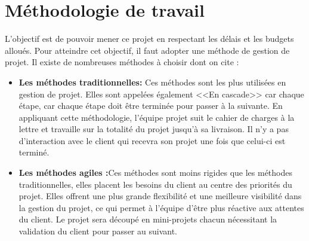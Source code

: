 \section{Méthodologie de travail}
L'objectif est de pouvoir mener ce projet en respectant les délais et les budgets alloués. Pour atteindre cet objectif, il faut adopter une méthode de gestion de projet. Il existe de nombreuses méthodes à choisir dont on cite :
\begin{itemize}
    \item \textbf{Les méthodes traditionnelles: }Ces méthodes sont les plus utilisées en gestion de projet. Elles sont appelées également <<En cascade>> car chaque étape, car chaque étape doit être terminée pour passer à la suivante. En appliquant cette méthodologie, l'équipe projet suit le cahier de charges à la lettre et travaille sur la totalité du projet jusqu'à sa livraison. Il n'y a pas d'interaction avec le client qui recevra son projet une fois que celui-ci est terminé.
    \item \textbf{Les méthodes agiles :}Ces méthodes sont moins rigides que les méthodes traditionnelles, elles placent les besoins du client au centre des priorités du projet. Elles offrent une plus grande flexibilité et une meilleure visibilité dans la gestion du projet, ce qui permet à l'équipe d'être plus réactive aux attentes du client. Le projet sera découpé en mini-projets chacun nécessitant la validation du client pour passer au suivant.
\end{itemize}
